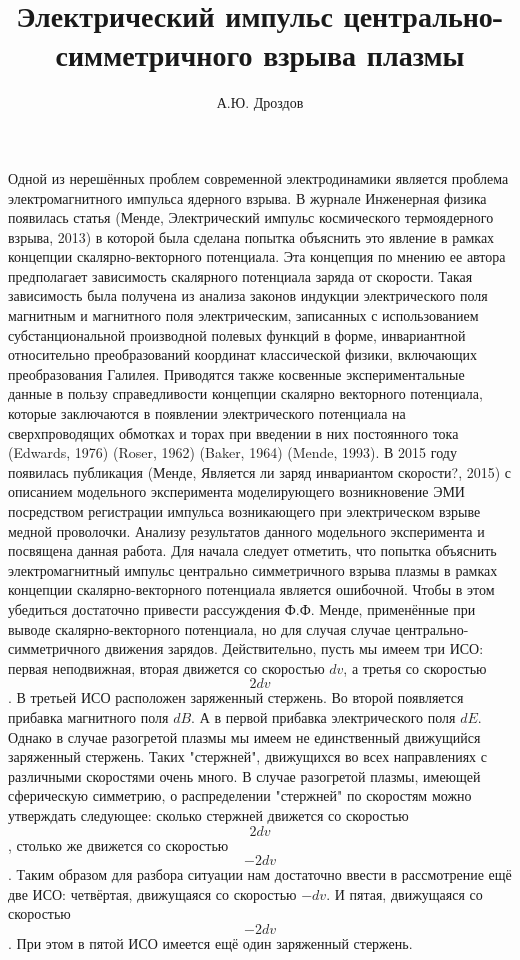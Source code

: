 ﻿\documentclass{article}
\begin{document}
\title{Электрический импульс центрально-симметричного взрыва плазмы}
\author{А.Ю. Дроздов}
Одной из нерешённых проблем современной электродинамики является проблема электромагнитного импульса ядерного взрыва. В журнале Инженерная физика появилась статья (Менде, Электрический импульс космического термоядерного взрыва, 2013) в которой была сделана попытка объяснить это явление в рамках концепции скалярно-векторного потенциала. Эта концепция по мнению ее автора предполагает зависимость скалярного потенциала заряда от скорости.
Такая зависимость была получена из анализа законов индукции электрического поля магнитным и магнитного поля электрическим, записанных с использованием субстанциональной производной полевых функций в форме, инвариантной относительно преобразований координат классической физики, включающих преобразования Галилея. 
Приводятся также косвенные экспериментальные данные в пользу справедливости концепции скалярно векторного потенциала, которые заключаются в появлении электрического потенциала на сверхпроводящих обмотках и торах при введении в них постоянного тока (Edwards, 1976) (Roser, 1962) (Baker, 1964) (Mende, 1993).
В 2015 году появилась публикация (Менде, Является ли заряд инвариантом скорости?, 2015) с описанием модельного эксперимента моделирующего возникновение ЭМИ посредством регистрации импульса возникающего при электрическом взрыве медной проволочки. Анализу результатов данного модельного эксперимента и посвящена данная работа.
Для начала следует отметить, что попытка объяснить электромагнитный импульс центрально симметричного взрыва плазмы в рамках концепции скалярно-векторного потенциала является ошибочной. Чтобы в этом убедиться достаточно привести рассуждения Ф.Ф. Менде, применённые при выводе скалярно-векторного потенциала, но для случая случае центрально-симметричного движения зарядов.
Действительно, пусть мы имеем три ИСО: первая неподвижная, вторая движется со скоростью $dv$, а третья со скоростью\[2dv\]. В третьей ИСО расположен заряженный стержень. Во второй появляется прибавка магнитного поля $dB$. А в первой прибавка электрического поля $dE$.
Однако в случае разогретой плазмы мы имеем не единственный движущийся заряженный стержень. Таких "стержней", движущихся во всех направлениях с различными скоростями очень много. 
В случае разогретой плазмы, имеющей сферическую симметрию, о распределении "стержней" по скоростям можно утверждать следующее: сколько стержней движется со скоростью \[2dv\], столько же движется со скоростью \[-2dv\].
Таким образом для разбора ситуации нам достаточно ввести в рассмотрение ещё две ИСО: четвёртая, движущаяся со скоростью $-dv$. И пятая, движущаяся со скоростью \[-2dv\]. При этом в пятой ИСО имеется ещё один заряженный стержень.
\end{document}
